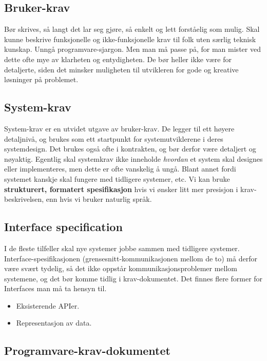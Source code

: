 \documentclass[11pt]{article}
\begin{document}
\subsection{Bruker-krav}
\label{sec-6.6}

   Bør skrives, så langt det lar seg gjøre, så enkelt og lett forståelig 
   som mulig. Skal kunne beskrive funksjonelle 
   og ikke-funksjonelle krav til folk uten særlig teknisk kunskap.
   Unngå programvare-sjargon. Men man må passe på, for man mister 
   ved dette ofte mye av klarheten og entydigheten.
   De bør heller ikke være for detaljerte, siden det minsker
   muligheten til utvikleren for gode og kreative løsninger på problemet.
\subsection{System-krav}
\label{sec-6.7}

   System-krav er en utvidet utgave av bruker-krav. De legger til ett høyere detaljnivå, 
   og brukes som ett startpunkt for systemutviklerene i deres systemdesign.
   Det brukes også ofte i kontrakten, og bør derfor være detaljert og nøyaktig.
   Egentlig skal systemkrav ikke inneholde \emph{hvordan} et system skal designes eller implementeres, 
   men dette er ofte vanskelig å ungå. Blant annet fordi systemet kanskje skal fungere med tidligere systemer, etc.
   Vi kan bruke \textbf{strukturert, formatert spesifikasjon} hvis vi ønsker litt mer presisjon i krav-beskrivelsen, enn hvis vi bruker naturlig språk.
\subsection{Interface specification}
\label{sec-6.8}

   I de fleste tilfeller skal nye systemer jobbe sammen med tidligere systemer. Interface-spesifikasjonen (grensesnitt-kommunikasjonen mellom de to) må derfor være svært tydelig, så det ikke oppstår kommunikasjonsproblemer mellom systemene, og det bør komme tidlig i krav-dokumentet.
   Det finnes flere former for Interfaces man må ta hensyn til.
\begin{itemize}
\item Eksisterende APIer.
\item Representasjon av data.
\end{itemize}
\subsection{Programvare-krav-dokumentet}
\label{sec-6.9}
\end{document}
